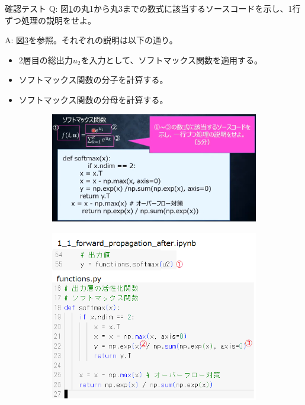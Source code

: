 \documentclass{ltjsarticle}
\begin{document}
\begin{itembox}[l]{確認テスト}
  Q: 図\ref{fig:day1_05_1}の丸1から丸3までの数式に該当するソースコードを示し、1行ずつ処理の説明をせよ。

  A: 図\ref{fig:day1_05_2}を参照。それぞれの説明は以下の通り。
  \begin{itemize}
    \item[①.] 2層目の総出力$u_2$を入力として、ソフトマックス関数を適用する。
    \item[②.] ソフトマックス関数の分子を計算する。
    \item[③.] ソフトマックス関数の分母を計算する。
  \end{itemize}
  
\end{itembox}

\begin{figure}[ht]
  \centering
  \begin{subfigure}[b]{0.45\textwidth}
    \centering
    \includegraphics[width=\textwidth]{./capture/confirm_test/day1_05_1.png}
    \caption{}
    \label{fig:day1_05_1}
  \end{subfigure}
  \hfill
  \begin{subfigure}[b]{0.45\textwidth}
    \centering
    \includegraphics[width=\textwidth]{./capture/confirm_test/day1_05_2.png}
    \caption{}
    \label{fig:day1_05_2}
  \end{subfigure}
  \caption{}
\end{figure}
\end{document}
